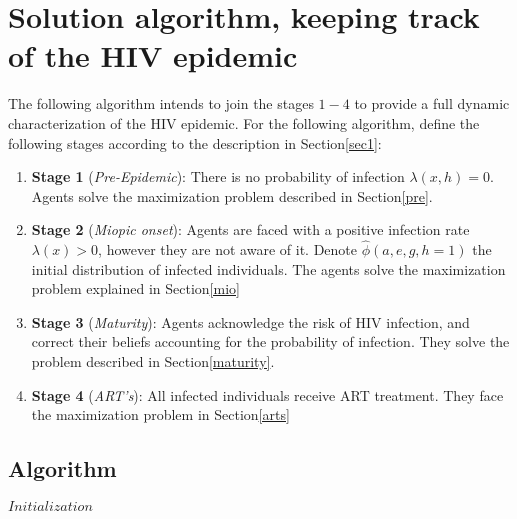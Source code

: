 \section{Solution algorithm, keeping track of the HIV epidemic }\label{algorithm}
The following algorithm intends to join the stages $1-4$ to provide a full dynamic characterization of the HIV epidemic.  
For the following algorithm, define the following stages according to the description in Section\ref{sec1}:
\begin{enumerate}
\item[]\textbf{Stage 1} (\textit{Pre-Epidemic}): There is no probability of infection $\lambda(x,h)=0$. Agents solve the maximization problem described in Section\ref{pre}.
\item[]\textbf{Stage 2} (\textit{Miopic onset}): Agents are faced with a positive infection rate $\lambda(x)>0$, however they are not aware of it. Denote $\hat{\phi}(a,e,g,h=1)$ the initial distribution of infected individuals. The agents solve the maximization problem explained in Section\ref{mio}
\item[]\textbf{Stage 3} (\textit{Maturity}): Agents acknowledge the risk of HIV infection, and correct their beliefs accounting for the probability of infection. They solve the problem described in Section\ref{maturity}. 
\item[]\textbf{Stage 4} (\textit{ART's}): All infected individuals receive ART treatment. They face the maximization problem in Section\ref{arts}
\end{enumerate}
\newpage
\subsection*{Algorithm}
\noindent$Initialization$ \\


